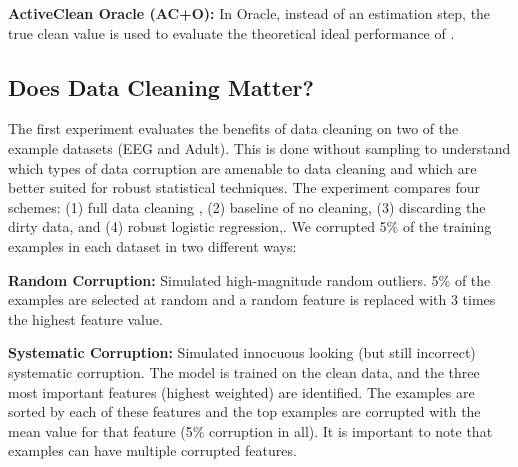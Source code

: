 \vspace{0.25em}

\noindent\textbf{ActiveClean Oracle (AC+O): } In \sys Oracle, instead of an estimation step, the true clean value is used to evaluate the theoretical ideal performance of \sys.

\subsection{Does Data Cleaning Matter?}
The first experiment evaluates the benefits of data cleaning on two of the example datasets (EEG and Adult).
This is done without sampling to understand which types of data corruption are amenable to data cleaning and which are better suited for robust statistical techniques.
The experiment compares four schemes: (1) full data cleaning  , (2) baseline of no cleaning, (3) discarding the dirty data, and (4) robust logistic regression,. We corrupted 5\% of the training examples in each dataset in two different ways:

\vspace{0.5em}

\noindent\textbf{Random Corruption: } Simulated high-magnitude random outliers. 5\% of the examples are selected at random and a random feature is replaced with 3 times the highest feature value.

\vspace{0.5em}

\noindent\textbf{Systematic Corruption: } Simulated innocuous looking (but still incorrect) systematic corruption. The model is trained on the clean data, and the three most important features (highest weighted) are identified. The examples are sorted by each of these features and the top examples are corrupted with the mean value for that feature (5\% corruption in all). 
It is important to note that examples can have multiple corrupted features.

